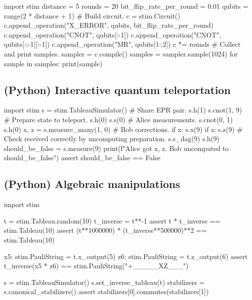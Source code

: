 \documentclass[onecolumn,unpublished]{quantumarticle}
\theoremstyle{definition}
\theoremstyle{definition}
\theoremstyle{definition}
\begin{document}
\begin{python}
    import stim
    distance = 5
    rounds = 20
    bit_flip_rate_per_round = 0.01
    qubits = range(2 * distance + 1)
    # Build circuit.
    c = stim.Circuit()
    c.append_operation("X_ERROR", qubits, bit_flip_rate_per_round)
    c.append_operation("CNOT", qubits[:-1])
    c.append_operation("CNOT", qubits[::-1][:-1])
    c.append_operation("MR", qubits[1::2])
    c *= rounds
    # Collect and print samples.
    sampler = c.compile()
    samples = sampler.sample(1024)
    for sample in samples: print(sample)
\end{python}

\subsection{(Python) Interactive quantum teleportation}

\begin{python}
    import stim
    s = stim.TableauSimulator()
    # Share EPR pair.
    s.h(1)
    s.cnot(1, 9)
    # Prepare state to teleport.
    s.h(0)
    s.s(0)
    # Alice measurements.
    s.cnot(0, 1)
    s.h(0)
    x, z = s.measure_many(1, 0)
    # Bob corrections.
    if x: s.x(9)
    if z: s.z(9)
    # Check received correctly by uncomputing preparation.
    s.s_dag(9)
    s.h(9)
    should_be_false = s.measure(9)
    print(f"Alice got {x}, {z}. Bob uncomputed to {should_be_false}")
    assert should_be_false == False
\end{python}

\subsection{(Python) Algebraic manipulations}

\begin{python}
    import stim

    t = stim.Tableau.random(10)
    t_inverse = t**-1
    assert t * t_inverse == stim.Tableau(10)
    assert (t**1000000) * (t_inverse**500000)**2 == stim.Tableau(10)

    x5: stim.PauliString = t.x_output(5)
    z6: stim.PauliString = t.z_output(6)
    assert t_inverse(x5 * z6) == stim.PauliString("+_____XZ___")
    
    s = stim.TableauSimulator()
    s.set_inverse_tableau(t)
    stabilizers = s.canonical_stabilizers()
    assert stabilizers[0].commutes(stabilizers[1])
\end{python}
\end{document}
